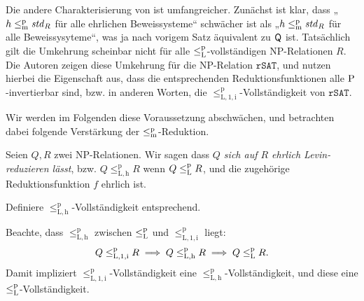 Die andere Charakterisierung von \citeauthor{fenner_inverting_2003} ist umfangreicher.
Zunächst ist klar, dass „$h\leqmp\mathit{std}_R$ für alle ehrlichen Beweissysteme“ schwächer ist als „$h\leqmp\mathit{std}_R$ für alle Beweissysyteme“, was ja nach vorigem Satz äquivalent zu $\hQ$ ist.
Tatsächlich gilt die Umkehrung scheinbar nicht für alle $\leqlp$-vollständigen NP-Relationen $R$. 
Die Autoren zeigen diese Umkehrung für die NP-Relation $\mathtt{rSAT}$, und nutzen hierbei die Eigenschaft aus, dass die entsprechenden Reduktionsfunktionen alle $\P$-invertierbar sind, bzw. in anderen Worten, die $\leq_\mathrm{L,1,i}^\mathrm p$-Vollständigkeit von $\mathtt{rSAT}$.

Wir werden im Folgenden diese Voraussetzung abschwächen, und betrachten dabei folgende Verstärkung der $\leqmp$-Reduktion.
\begin{definition}
    Seien $Q, R$ zwei NP-Relationen. Wir sagen dass \emph{$Q$ sich auf $R$ ehrlich Levin-reduzieren lässt}, bzw. $Q\leq_\mathrm{L,h}^\mathrm p R$ wenn $Q\leqlp R$, und die zugehörige Reduktionsfunktion $f$ ehrlich ist.

    Definiere $\leq_\mathrm{L,h}^\mathrm p$-Vollständigkeit entsprechend.
\end{definition}
Beachte, dass $\leq_\mathrm{L,h}^\mathrm p$ zwischen $\leqlp$ und $\leq_\mathrm{L,1,i}^\mathrm{p}$ liegt:
\[ Q\leq_\mathrm{L,1,i}^\mathrm{p} R \implies Q\leq_\mathrm{L,h}^\mathrm p R \implies Q\leqlp R. \]
Damit impliziert $\leq_\mathrm{L,1,i}^\mathrm{p}$-Vollständigkeit eine  $\leq_\mathrm{L,h}^\mathrm p$-Vollständigkeit, und diese eine $\leqlp$-Vollständigkeit.

